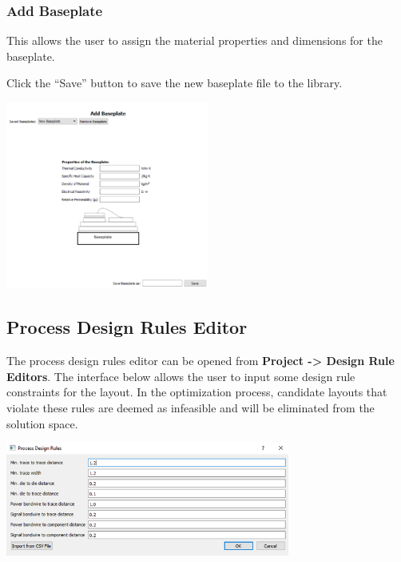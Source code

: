 \documentclass[11pt]{article}
\begin{document}
\pagebreak

\subsubsection{Add Baseplate}
\label{sec-3-1-7}

This allows the user to assign the material properties and dimensions for the baseplate.

Click the “Save” button to save the new baseplate file to the library.

\begin{center}
\includegraphics[width=0.5\textwidth]{./figs/39_TL-Base.png}
\end{center}

\pagebreak

\subsection{Process Design Rules Editor}
\label{sec-3-2}

The process design rules editor can be opened from \textbf{Project -> Design Rule Editors}. The interface below allows the user to input some design rule constraints for the layout. In the optimization process, candidate layouts that violate these rules are deemed as infeasible and will be eliminated from the solution space.

\begin{center}
\includegraphics[width=0.7\textwidth]{./figs/40_DRC.png}
\end{center}
\end{document}
